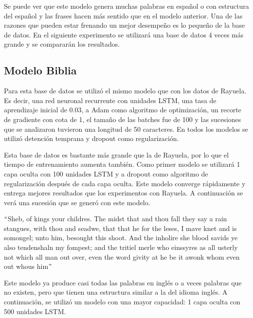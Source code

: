 \vspace{1em}

Se puede ver que este modelo genera muchas palabras en español o con estructura del español y las frases hacen más sentido que en el modelo anterior. Una de las razones que pueden estar frenando un mejor desempeño es lo pequeño de la base de datos. En el siguiente experimento se utilizará una base de datos 4 veces más grande y se compararán los resultados.


\subsection{Modelo Biblia}
Para esta base de datos se utilizó el mismo modelo que con los datos de Rayuela. Es decir, una red neuronal recurrente con unidades LSTM, una tasa de aprendizaje inicial de 0.03, a Adam como algoritmo de optimización, un recorte de gradiente con cota de 1, el tamaño de las batches fue de 100 y las sucesiones que se analizaron tuvieron una longitud de 50 caracteres. En todos los modelos se utilizó detención temprana y dropout como regularización.

\vspace{1em}

Esta base de datos es bastante más grande que la de Rayuela, por lo que el tiempo de entrenamiento aumenta también. Como primer modelo se utilizará 1 capa oculta con 100 unidades LSTM y a dropout como algoritmo de regularización después de cada capa oculta. Este modelo converge rápidamente y entrega mejores resultados que los experimentos con Rayuela. A continuación se verá una sucesión que se generó con este modelo.

\vspace{1em}

$``$Sheb, of kings your childres. The midst that and thou fall they say a rain stangues, with thou and seadwe, that that he for the leses, I mave knet and is somongel; unto him, besought this shoot. And the inholire she blood savids ye also tendenshaln my fompest; and the tritiel merle who einssyres as all usterly not which all man out over, even the word givity at he be it awonk whom even out whous him$"$

\vspace{1em}

Este modelo ya produce casi todas las palabras en inglés o a veces palabras que no existen, pero que tienen una estructura similar a la del idioma inglés. A continuación, se utilizó un modelo con una mayor capacidad: 1 capa oculta con 500 unidades LSTM.

